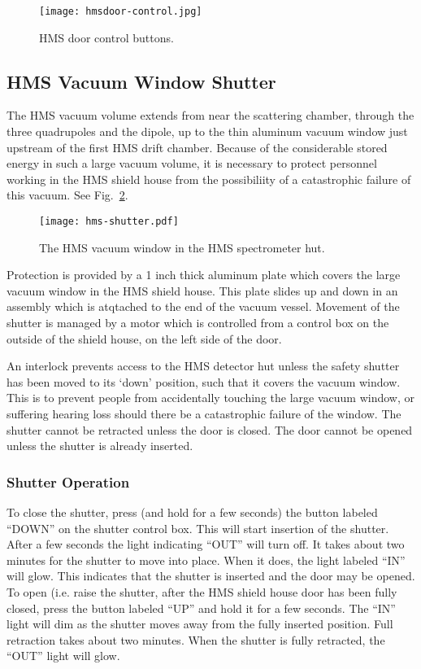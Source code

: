 \begin{figure}
\begin{center}
\texttt{[image: hmsdoor-control.jpg]}
\caption{\label{fig:hmsdoorcontrol}HMS door control buttons.
}
\end{center}
\end{figure}

\subsection{HMS Vacuum Window Shutter}
The HMS vacuum volume extends from near the scattering chamber,
through the three quadrupoles and the dipole, up to the thin aluminum
vacuum window just upstream of the first HMS drift chamber. Because of
the considerable stored energy in such a large vacuum volume, it is
necessary to protect personnel working in the HMS shield house from
the possibiliity of a catastrophic failure of this vacuum.  See
Fig.~\ref{fig:hmsshutter}.

\begin{figure}
\texttt{[image: hms-shutter.pdf]}
\caption{\label{fig:hmsshutter}The HMS vacuum window in the HMS spectrometer hut.
}
\end{figure}

Protection is provided by a 1 inch thick aluminum plate which covers
the large vacuum window in the HMS shield house. This plate slides up
and down in an assembly which is atqtached to the end of the vacuum
vessel. Movement of the shutter is managed by a motor which is
controlled from a control box on the outside of the shield house, on
the left side of the door.

An interlock prevents access to the HMS detector hut unless the safety shutter has been moved to its `down' position, such that it covers the vacuum window. This is to prevent people from accidentally touching the large vacuum window, or suffering hearing loss should there be a catastrophic failure of the window. The shutter cannot be retracted unless the door is closed. The door cannot be opened unless the shutter is already inserted.

\subsubsection{Shutter Operation}

To close the shutter, press (and hold for a few seconds) the button
labeled ``DOWN'' on the shutter control box. This will start insertion
of the shutter. After a few seconds the light indicating ``OUT'' will
turn off. It takes about two minutes for the shutter to move into
place. When it does, the light labeled ``IN'' will glow. This
indicates that the shutter is inserted and the door may be opened.  To
open (i.e. raise the shutter, after the HMS shield house door has been
fully closed, press the button labeled ``UP'' and hold it for a few
seconds. The ``IN'' light will dim as the shutter moves away from the
fully inserted position. Full retraction takes about two minutes. When
the shutter is fully retracted, the ``OUT'' light will glow.

